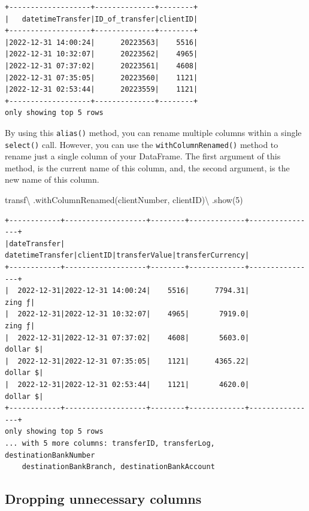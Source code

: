 \documentclass[
  11pt,
  letterpaper,
  DIV=11,
  numbers=noendperiod]{scrreprt}
\newenvironment{Shaded}{\begin{snugshade}}{\end{snugshade}}
\newcommand{\DecValTok}[1]{\textcolor[rgb]{0.68,0.00,0.00}{#1}}
\newcommand{\NormalTok}[1]{\textcolor[rgb]{0.00,0.23,0.31}{#1}}
\newcommand{\OperatorTok}[1]{\textcolor[rgb]{0.37,0.37,0.37}{#1}}
\newcommand{\StringTok}[1]{\textcolor[rgb]{0.13,0.47,0.30}{#1}}
\begin{document}
\begin{verbatim}
+-------------------+--------------+--------+
|   datetimeTransfer|ID_of_transfer|clientID|
+-------------------+--------------+--------+
|2022-12-31 14:00:24|      20223563|    5516|
|2022-12-31 10:32:07|      20223562|    4965|
|2022-12-31 07:37:02|      20223561|    4608|
|2022-12-31 07:35:05|      20223560|    1121|
|2022-12-31 02:53:44|      20223559|    1121|
+-------------------+--------------+--------+
only showing top 5 rows
\end{verbatim}

By using this \texttt{alias()} method, you can rename multiple columns
within a single \texttt{select()} call. However, you can use the
\texttt{withColumnRenamed()} method to rename just a single column of
your DataFrame. The first argument of this method, is the current name
of this column, and, the second argument, is the new name of this
column.

\begin{Shaded}
\begin{Highlighting}[]
\NormalTok{transf}\OperatorTok{\textbackslash{}}
\NormalTok{  .withColumnRenamed(}\StringTok{\textquotesingle{}clientNumber\textquotesingle{}}\NormalTok{, }\StringTok{\textquotesingle{}clientID\textquotesingle{}}\NormalTok{)}\OperatorTok{\textbackslash{}}
\NormalTok{  .show(}\DecValTok{5}\NormalTok{)}
\end{Highlighting}
\end{Shaded}

\begin{verbatim}
+------------+-------------------+--------+-------------+----------------+
|dateTransfer|   datetimeTransfer|clientID|transferValue|transferCurrency|
+------------+-------------------+--------+-------------+----------------+
|  2022-12-31|2022-12-31 14:00:24|    5516|      7794.31|          zing ƒ|
|  2022-12-31|2022-12-31 10:32:07|    4965|       7919.0|          zing ƒ|
|  2022-12-31|2022-12-31 07:37:02|    4608|       5603.0|        dollar $|
|  2022-12-31|2022-12-31 07:35:05|    1121|      4365.22|        dollar $|
|  2022-12-31|2022-12-31 02:53:44|    1121|       4620.0|        dollar $|
+------------+-------------------+--------+-------------+----------------+
only showing top 5 rows
... with 5 more columns: transferID, transferLog, destinationBankNumber
    destinationBankBranch, destinationBankAccount
\end{verbatim}

\hypertarget{dropping-unnecessary-columns}{%
\subsection{Dropping unnecessary
columns}\label{dropping-unnecessary-columns}}
\end{document}
